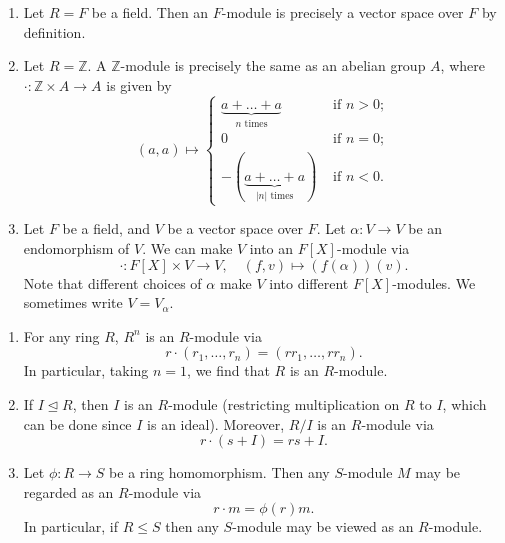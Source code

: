 \documentclass[egregdoesnotlikesansseriftitles,a4paper]{scrartcl}
\begin{document}
\begin{example*}
       \begin{enumerate}
             \item Let $R=F$ be a field. Then an $F$-module is precisely a vector space over $F$ by definition.
             \item Let $R=\mathbb{Z}$. A $\mathbb{Z}$-module is precisely the same as an abelian group $A$, where $\cdot : \mathbb{Z} \times A \rightarrow A$ is given by 
             \begin{equation*}
                  (a,a)\mapsto \begin{cases}
                        \underbrace{a+\ldots +a}_{n \text{ times} }  &\text{ if } n>0 ;\\
                        0 &\text{ if } n=0 ;\\
                        -(\underbrace{a+\ldots +a}_{\left|n\right| \text{ times} }) &\text{ if } n<0 .
                  \end{cases}
             \end{equation*}
             \item Let $F$ be a field, and $ V$ be a vector space over $F$. Let $\alpha:V \rightarrow V$ be an endomorphism of $V$. We can make $V$ into an $F[X]$-module via \[
                  \cdot : F[X] \times V \rightarrow V, \quad (f,v) \mapsto (f (\alpha))(v)
             .\] Note that different choices of $\alpha$ make $V$ into different $F[X]$-modules. We sometimes write $V=V_{\alpha}$.
       \end{enumerate}
\end{example*}
\begin{example*}
       \begin{enumerate}
             \item For any ring $R$, $R^{n}$ is an $R$-module via \[
             r \cdot (r_1 , \ldots, r_n)= (r r_1 , \ldots, r r_n)
             .\] In particular, taking $n=1$, we find that $R$ is an $R$-module.
             \item If $I \unlhd R$, then $I$ is an $R$-module (restricting multiplication on $R$ to $I$, which can be done since $I$ is an ideal). Moreover, $R/I$ is an $R$-module via \[
             r \cdot (s+I)= rs+I
             .\] 
             \item Let $\phi: R \rightarrow S$ be a ring homomorphism. Then any $S$-module $M$ may be regarded as an $R$-module via \[
             r \cdot m = \phi (r)m
             .\] In particular, if $R \leq S$ then any $S$-module may be viewed as an $R$-module.
       \end{enumerate}
\end{example*}
\end{document}
